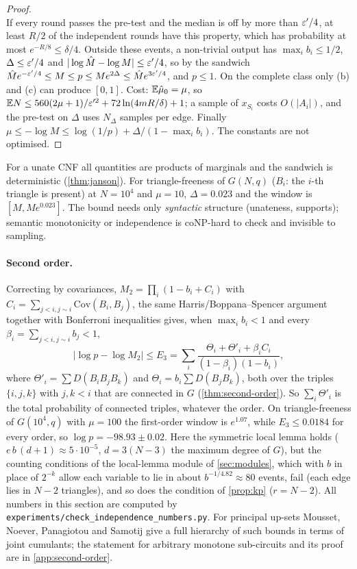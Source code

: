 \begin{proof}
\[\]
If every round passes the pre-test and the median is off by more than $\varepsilon'/4$, at
least $R/2$ of the independent rounds have this property, which has probability at
most $e^{-R/8}\le\delta/4$.
Outside these events, a non-trivial output has $\max_ib_i\le1/2$, $\Delta\le\varepsilon'/4$ and
$|\log\hat M-\log M|\le\varepsilon'/4$, so by the sandwich
$\hat Me^{-\varepsilon'/4}\le M\le p\le Me^{2\Delta}\le\hat Me^{3\varepsilon'/4}$, and $p\le1$. On the
complete class only (b) and (c) can produce $[0,1]$. Cost: $\mathbb{E}\hat\mu_0=\mu$, so
$\mathbb{E} N\le560(2\mu+1)/\varepsilon'^2+72\ln(4mR/\delta)+1$; a sample of $x_{S_i}$ costs $O(|A_i|)$,
and the pre-test on $\Delta$ uses $N_\Delta$ samples per edge. Finally
$\mu\le-\log M\le\log(1/p)+\Delta/(1-\max_ib_i)$. The constants are not optimised.
\end{proof}

For a unate CNF all quantities are products of marginals and the sandwich is
deterministic (\cref{thm:janson}). For triangle-freeness of $G(N,q)$ ($B_i$: the
$i$-th triangle is present) at $N=10^4$ and $\mu=10$, $\Delta=0.023$ and the window is
$[M,Me^{0.023}]$. The bound needs only \emph{syntactic} structure (unateness,
supports); semantic monotonicity or independence is coNP-hard to check and
invisible to sampling.

\paragraph{Second order.} Correcting by covariances,
$M_2=\prod_i(1-b_i+C_i)$ with $C_i=\sum_{j<i,j\sim i}\mathrm{Cov}(B_i,B_j)$, the same
Harris/Boppana--Spencer argument together with Bonferroni inequalities gives,
when $\max_ib_i<1$ and every $\beta_i=\sum_{j<i,j\sim i}b_j<1$,
\[
|\log p-\log M_2|\le E_3=\sum_i\frac{\Theta_i+\Theta'_i+\beta_iC_i}{(1-\beta_i)(1-b_i)},
\]
where $\Theta'_i=\sum D(B_iB_jB_k)$ and $\Theta_i=b_i\sum D(B_jB_k)$, both over the
triples $\{i,j,k\}$ with $j,k<i$ that are connected in $G$ (\cref{thm:second-order}).
So $\sum_i\Theta'_i$ is the total probability of connected triples, whatever the
order. On triangle-freeness of $G(10^4,q)$ with $\mu=100$ the first-order window is
$e^{1.07}$, while $E_3\le0.0184$ for every order, so $\log p=-98.93\pm0.02$. Here the
symmetric local lemma holds ($e\,b\,(d+1)\approx5\cdot10^{-5}$, $d=3(N-3)$ the maximum
degree of $G$), but the counting conditions of the local-lemma module of
\cref{sec:modules}, which with $b$ in place of $2^{-k}$ allow each variable to lie in
about $b^{-1/4.82}\approx80$ events, fail (each edge lies in $N-2$ triangles), and so
does the condition of \cref{prop:kp} ($r=N-2$). All numbers in this section are
computed by \texttt{experiments/check\_independence\_numbers.py}. For principal up-sets
Mousset, Noever, Panagiotou and Samotij \cite{mnps2020} give a full hierarchy of such
bounds in terms of joint cumulants; the statement for arbitrary monotone sub-circuits
and its proof are in \cref{app:second-order}.

